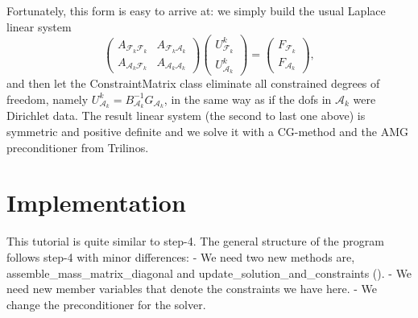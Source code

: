 \documentclass{article}
\begin{document}
Fortunately, this form is easy to arrive at: we simply build the usual Laplace
linear system
\begin{equation*}
\begin{pmatrix}
 A_{\mathcal{F}_k\mathcal{F}_k} & A_{\mathcal{F}_k\mathcal{A}_k} \\
 A_{\mathcal{A}_k\mathcal{F}_k} & A_{\mathcal{A}_k\mathcal{A}_k}
\end{pmatrix}
\begin{pmatrix}
 U^k_{\mathcal{F}_k}\\ U^k_{\mathcal{A}_k}
\end{pmatrix}
=
\begin{pmatrix}
 F_{\mathcal{F}_k}\\ F_{\mathcal{A}_k}
\end{pmatrix},
\end{equation*}
and then let the ConstraintMatrix class eliminate all constrained degrees of
freedom, namely $U^k_{\mathcal{A}_k}=B^{-1}_{\mathcal{A}_k}G_{\mathcal{A}_k}$,
in the same way as if the dofs in $\mathcal{A}_k$ were Dirichlet data. The
result linear system (the second to last one above) is symmetric and positive
definite and we solve it with a CG-method
and the AMG preconditioner from Trilinos.


\section{Implementation}

This tutorial is quite similar to step-4. The general structure of the program
follows step-4 with minor differences:
- We need two new methods are, assemble\_mass\_matrix\_diagonal and
  update\_solution\_and\_constraints ().
- We need new member variables that denote the constraints we have here.
- We change the preconditioner for the solver.
\end{document}
